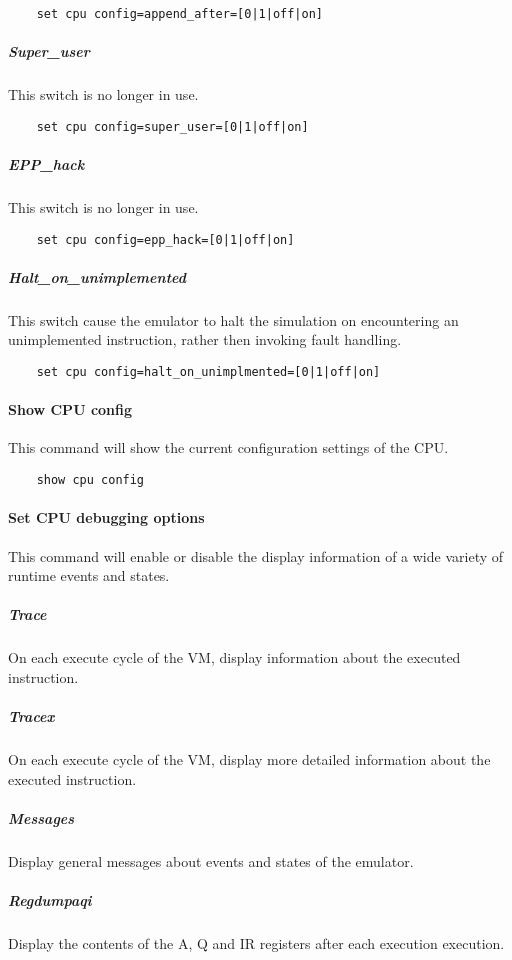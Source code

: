 \documentclass[notitlepage]{report}
\begin{document}
\begin{lstlisting}
	set cpu config=append_after=[0|1|off|on]
\end{lstlisting}

\subparagraph{Super\_user}
This switch is no longer in use.

\begin{lstlisting}
	set cpu config=super_user=[0|1|off|on]
\end{lstlisting}

\subparagraph{EPP\_hack}
This switch is no longer in use.

\begin{lstlisting}
	set cpu config=epp_hack=[0|1|off|on]
\end{lstlisting}

\subparagraph{Halt\_on\_unimplemented}
This switch cause the emulator to halt the simulation on encountering an unimplemented instruction, rather then invoking fault handling.

\begin{lstlisting}
	set cpu config=halt_on_unimplmented=[0|1|off|on]
\end{lstlisting}

\paragraph{Show CPU config}
This command will show the current configuration settings of the CPU.

\begin{lstlisting}
	show cpu config
\end{lstlisting}

\paragraph{Set CPU debugging options}
This command will enable or disable the display information of a wide variety of runtime events and states.

\subparagraph{Trace}
On each execute cycle of the VM, display information about the executed instruction.

\subparagraph{Tracex}
On each execute cycle of the VM, display more detailed information about the executed instruction.

\subparagraph{Messages}
Display general messages about events and states of the emulator.

\subparagraph{Regdumpaqi}
Display the contents of the A, Q and IR registers after each execution execution.
\end{document}
